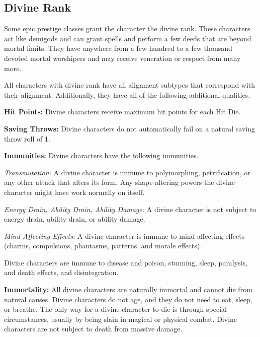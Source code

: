 \subsection{Divine Rank}
\label{Divine Rank}
Some epic prestige classes grant the character the divine rank. These characters act like demigods and can grant spells and perform a few deeds that are beyond mortal limits. They have anywhere from a few hundred to a few thousand devoted mortal worshipers and may receive veneration or respect from many more.

All characters with divine rank have all alignment subtypes that correspond with their alignment. Additionally, they have all of the following additional qualities.

\textbf{Hit Points:} Divine characters receive maximum hit points for each Hit Die.


\textbf{Saving Throws:} Divine characters do not automatically fail on a natural saving throw roll of 1.

\textbf{Immunities:} Divine characters have the following immunities.

\textit{Transmutation:} A divine character is immune to polymorphing, petrification, or any other attack that alters its form. Any shape-altering powers the divine character might have work normally on itself.

\textit{Energy Drain, Ability Drain, Ability Damage:} A divine character is not subject to energy drain, ability drain, or ability damage.

\textit{Mind-Affecting Effects:} A divine character is immune to mind-affecting effects (charms, compulsions, phantasms, patterns, and morale effects).


Divine characters are immune to disease and poison, stunning, sleep, paralysis, and death effects, and disintegration.

\textbf{Immortality:} All divine characters are naturally immortal and cannot die from natural causes. Divine characters do not age, and they do not need to eat, sleep, or breathe. The only way for a divine character to die is through special circumstances, usually by being slain in magical or physical combat. Divine characters are not subject to death from massive damage.

